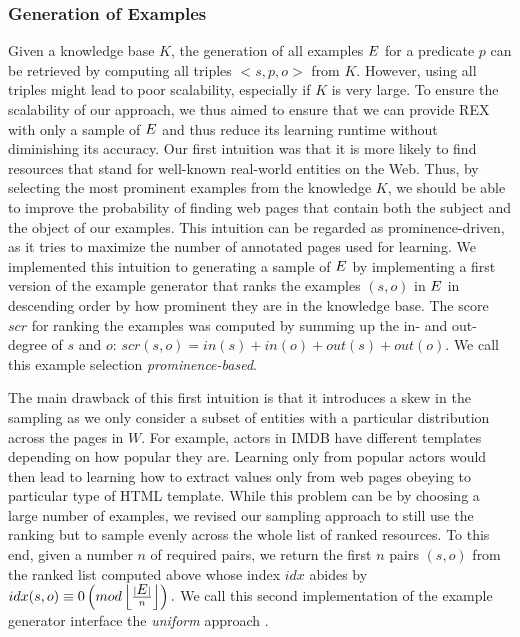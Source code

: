 \documentclass{llncs}
\newcommand{\examples}{\mbox{\ensuremath{E}}}
\begin{document}
\subsubsection{Generation of Examples}
Given a knowledge base $K$, the generation of all examples $\examples$ for a predicate $p$ can be retrieved by computing all triples $<s,p,o>$ from $K$.
However, using all triples might lead to poor scalability, especially if $K$ is very large.
To ensure the scalability of our approach, we thus aimed to ensure that we can provide REX with only a sample of $\examples$ and thus reduce its learning runtime without diminishing its accuracy.  
Our first intuition was that it is more likely to find resources that stand for well-known real-world entities on the Web. 
Thus, by selecting the most prominent examples from the knowledge $K$, we should be able to improve the probability of finding web pages that contain both the subject and the object of our examples. 
This intuition can be regarded as prominence-driven, as it tries to maximize the number of annotated pages used for learning. 
We implemented this intuition to generating a sample of $\examples$ by implementing a first version of the example generator that ranks the examples $(s, o)$ in $\examples$ in descending order by how prominent they are in the knowledge base. The score $scr$ for ranking the examples was computed by summing up the in- and out-degree of $s$ and $o$:
$scr(s, o) = in(s) + in(o) + out(s) + out(o)$. 
We call this example selection \emph{prominence-based}.

The main drawback of this first intuition is that it introduces a skew in the sampling as we only consider a subset of entities with a particular distribution across the pages in $W$. 
For example, actors in IMDB have different templates depending on how popular they are. 
Learning only from popular actors would then lead to learning how to extract values only from web pages obeying to particular type of HTML template. 
While this problem can be by choosing a large number of examples, we revised our sampling approach to still use the ranking but to sample evenly across the whole list of ranked resources. 
To this end, given a number $n$ of required pairs, we return the first $n$ pairs $(s,o)$ from the ranked list computed above whose index $idx$ abides by
$idx(s, o) \equiv 0  \left(mod\left \lfloor{\frac{|\examples|}{n}}\right \rfloor \right).$
We call this second implementation of the example generator interface the \emph{uniform} approach .
\end{document}
